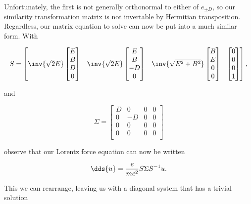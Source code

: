 Unfortunately, the first is not generally orthonormal to either of $e_{\pm D}$, so our similarity transformation matrix is not invertable by Hermitian transposition.  Regardless, our matrix equation to solve can now be put into a much similar form.  With

\begin{equation}\label{eqn:relElectroDynProblemSet2:710}
S =
\begin{bmatrix}
\inv{\sqrt{2}E}
\begin{bmatrix} 
E \\
B \\
D \\
0
\end{bmatrix} 
&
\inv{\sqrt{2}E}
\begin{bmatrix} 
E \\
B \\
-D \\
0
\end{bmatrix} &
\inv{\sqrt{E^2 + B^2}}
\begin{bmatrix} 
B \\
E \\
0 \\
0 
\end{bmatrix} &
\begin{bmatrix} 
0 \\
0 \\
0 \\
1 
\end{bmatrix}
\end{bmatrix},
\end{equation}

and 

\begin{equation}\label{eqn:relElectroDynProblemSet2:730}
\Sigma = 
\begin{bmatrix}
D & 0 & 0 & 0 \\
0 & -D & 0 & 0 \\
0 & 0 & 0 & 0 \\
0 & 0 & 0 & 0 \\
\end{bmatrix}
\end{equation}

observe that our Lorentz force equation can now be written

\begin{equation}\label{eqn:relElectroDynProblemSet2:750}
\dds{u} = \frac{e}{m c^2} S \Sigma S^{-1} u.
\end{equation}

This we can rearrange, leaving us with a diagonal system that has a trivial solution

